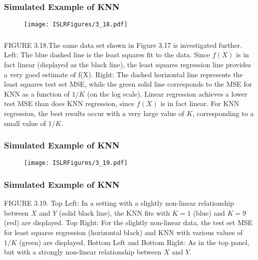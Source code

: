 \documentclass{beamer}
\begin{document}
      
      \begin{frame}
      	\frametitle{Simulated Example of KNN}
      	
      	\begin{figure}[h]
      		\centering
      		\texttt{[image: ISLRFigures/3\_18.pdf]}	
      			\end{figure}
      		\end{frame}
      		
      		 
         \begin{frame}\frametitle{}
       { FIGURE 3.18.The same data set shown in Figure 3.17 is investigated further.
      		Left: The blue dashed line is the least squares fit to the data. Since $f(X)$ is in
      		fact linear (displayed as the black line), the least squares regression line provides
      		a very good estimate of f(X). Right: The dashed horizontal line represents the
      		least squares test set MSE, while the green solid line corresponds to the MSE
      		for KNN as a function of $1/K$ (on the log scale). Linear regression achieves a
      		lower test MSE than does KNN regression, since $f(X)$ is in fact linear. For KNN
      		regression, the best results occur with a very large value of $K$, corresponding to a
      		small value of $1/K.$ }
      		\end{frame}
      	
      
      \begin{frame}
      	\frametitle{Simulated Example of KNN}
      	
      	\begin{figure}[h]
      		\centering
      		\texttt{[image: ISLRFigures/3\_19.pdf]}	   
      		\end{figure}
      \end{frame}
      
      
       \begin{frame}
       	\frametitle{Simulated Example of KNN}
      	 { FIGURE 3.19. Top Left: In a setting with a slightly non-linear relationship
      		between $X$ and $Y$ (solid black line), the KNN fits with $K = 1$ (blue) and $K = 9$
      		(red) are displayed. Top Right: For the slightly non-linear data, the test set MSE
      		for least squares regression (horizontal black) and KNN with various values of
      		$1/K$ (green) are displayed. Bottom Left and Bottom Right: As in the top panel,
      		but with a strongly non-linear relationship between $X$ and $Y$. }
      	\end{frame}
      
\end{document}
